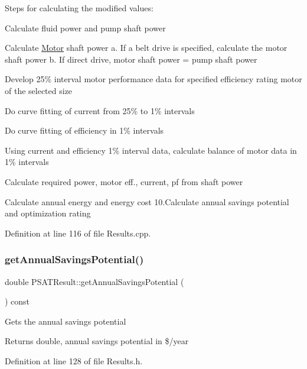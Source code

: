 Steps for calculating the modified values\+:
\begin{DoxyEnumerate}
\item Calculate fluid power and pump shaft power
\item Calculate \hyperlink{struct_motor}{Motor} shaft power a. If a belt drive is specified, calculate the motor shaft power b. If direct drive, motor shaft power = pump shaft power
\item Develop 25\% interval motor performance data for specified efficiency rating motor of the selected size
\item Do curve fitting of current from 25\% to 1\% intervals
\item Do curve fitting of efficiency in 1\% intervals
\item Using current and efficiency 1\% interval data, calculate balance of motor data in 1\% intervals
\item Calculate required power, motor eff., current, pf from shaft power
\item Calculate annual energy and energy cost 10.\+Calculate annual savings potential and optimization rating
\end{DoxyEnumerate}

Definition at line 116 of file Results.\+cpp.

\mbox{\label{class_p_s_a_t_result_a14fc75c2e0e92f74e3df1b97ed13b496}} 
\subsubsection{\texorpdfstring{get\+Annual\+Savings\+Potential()}{getAnnualSavingsPotential()}}
{\footnotesize\ttfamily double P\+S\+A\+T\+Result\+::get\+Annual\+Savings\+Potential (\begin{DoxyParamCaption}{ }\end{DoxyParamCaption}) const\hspace{0.3cm}{\ttfamily [inline]}}

Gets the annual savings potential \begin{DoxyReturn}{Returns}
double, annual savings potential in \$/year 
\end{DoxyReturn}


Definition at line 128 of file Results.\+h.

